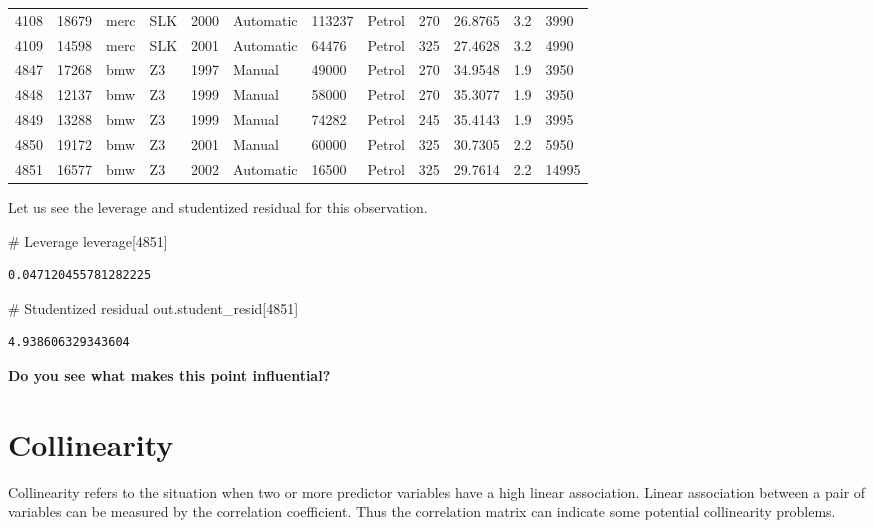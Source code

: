 \documentclass[
  letterpaper,
  DIV=11,
  numbers=noendperiod]{scrreprt}
\newenvironment{Shaded}{\begin{snugshade}}{\end{snugshade}}
\newcommand{\CommentTok}[1]{\textcolor[rgb]{0.37,0.37,0.37}{#1}}
\newcommand{\DecValTok}[1]{\textcolor[rgb]{0.68,0.00,0.00}{#1}}
\newcommand{\NormalTok}[1]{\textcolor[rgb]{0.00,0.23,0.31}{#1}}
\begin{document}
\begin{longtable}[]{@{}llllllllllll@{}}
4108 & 18679 & merc & SLK & 2000 & Automatic & 113237 & Petrol & 270 &
26.8765 & 3.2 & 3990 \\
4109 & 14598 & merc & SLK & 2001 & Automatic & 64476 & Petrol & 325 &
27.4628 & 3.2 & 4990 \\
4847 & 17268 & bmw & Z3 & 1997 & Manual & 49000 & Petrol & 270 & 34.9548
& 1.9 & 3950 \\
4848 & 12137 & bmw & Z3 & 1999 & Manual & 58000 & Petrol & 270 & 35.3077
& 1.9 & 3950 \\
4849 & 13288 & bmw & Z3 & 1999 & Manual & 74282 & Petrol & 245 & 35.4143
& 1.9 & 3995 \\
4850 & 19172 & bmw & Z3 & 2001 & Manual & 60000 & Petrol & 325 & 30.7305
& 2.2 & 5950 \\
4851 & 16577 & bmw & Z3 & 2002 & Automatic & 16500 & Petrol & 325 &
29.7614 & 2.2 & 14995 \\
\end{longtable}

Let us see the leverage and studentized residual for this observation.

\begin{Shaded}
\begin{Highlighting}[]
\CommentTok{\# Leverage}
\NormalTok{leverage[}\DecValTok{4851}\NormalTok{]}
\end{Highlighting}
\end{Shaded}

\begin{verbatim}
0.047120455781282225
\end{verbatim}

\begin{Shaded}
\begin{Highlighting}[]
\CommentTok{\# Studentized residual}
\NormalTok{out.student\_resid[}\DecValTok{4851}\NormalTok{]}
\end{Highlighting}
\end{Shaded}

\begin{verbatim}
4.938606329343604
\end{verbatim}

\textbf{Do you see what makes this point influential?}

\section{Collinearity}\label{collinearity}

Collinearity refers to the situation when two or more predictor
variables have a high linear association. Linear association between a
pair of variables can be measured by the correlation coefficient. Thus
the correlation matrix can indicate some potential collinearity
problems.
\end{document}
